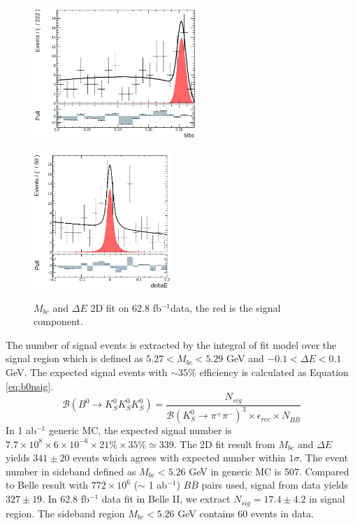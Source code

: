 \begin{figure}[htbp]
	\begin{minipage}[b]{0.5\linewidth}
		\centering 
		\includegraphics[height=5cm]{figures/mbc_data_new}
		\label{}
	\end{minipage}
	\begin{minipage}[b]{0.5\linewidth}
		\centering 
		\includegraphics[height=5.2cm]{figures/dE_data_new}
		\label{}
	\end{minipage}
\caption{$M_{bc}$ and $\Delta E$ 2D fit on 62.8 fb$^{-1}$data, the red is the signal component.}
\label{fig:2Ddata}
\end{figure}

 The number of signal events is extracted by the integral of fit model over the signal region which is defined as $5.27 < M_{bc} < 5.29 $ GeV and $-0.1 < \Delta E < 0.1$ GeV.
 The expected signal events with $\sim 35\%$ efficiency is calculated as Equation \ref{eq:b0nsig}.
 \begin{equation}\label{eq:b0nsig}
 \mathcal{B}(B^0 \to K_S^0  K_S^0  K_S^0)=
 \frac{N_{sig}}{\mathcal{B}(K_S^0\to \pi^+\pi^-)^3\times
 	\epsilon_{rec}\times N_{B\bar{B}}}
 \end{equation}
 In 1 ab$^{-1}$ generic MC, the expected signal number is $7.7\times 10^8 \times 6\times 10^{-6} \times 21\% \times 35\% \simeq 339$. The 2D fit result from $M_{bc}$ and $\Delta E$ yields $341\pm 20$ events which agrees with expected number within $1\sigma$. The event number in sideband defined as $M_{bc}<5.26$ GeV in generic MC is 507. Compared to Belle result with $772\times 10^6$ ($\sim$ 1 ab$^{-1}$) $B\overline{B}$ pairs used, signal from data yields $327\pm 19$. In 62.8 fb$^{-1}$ data fit in Belle II, we extract $N_{sig} = 17.4 \pm 4.2$ in signal region. The sideband region $M_{bc}<5.26$ GeV contains 60 events in data. 
 
